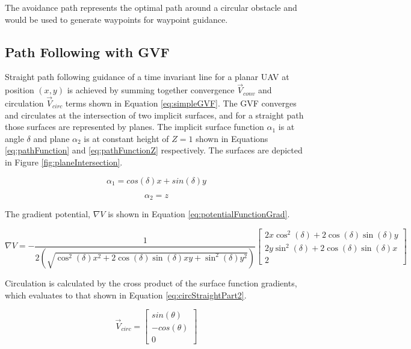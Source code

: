 \documentclass[conf]{new-aiaa}
\begin{document}
The avoidance path represents the optimal path around a circular obstacle and would be used to generate waypoints for waypoint guidance.


\subsection{Path Following with GVF}

Straight path following guidance of a time invariant line for a planar UAV at position $(x,y)$ is achieved by summing together convergence $\overrightarrow{V}_{conv}$ and circulation $\overrightarrow{V}_{circ}$ terms shown in Equation \ref{eq:simpleGVF}. The GVF converges and circulates at the intersection of two implicit surfaces, and for a straight path those surfaces are represented by planes. The implicit surface function $\alpha_1$ is at angle $\delta$ and plane $\alpha_2$ is at constant height of $Z = 1$ shown in Equations \ref{eq:pathFunction} and \ref{eq:pathFunctionZ} respectively. The surfaces are depicted in Figure \ref{fig:planeIntersection}.


\begin{equation}
\label{eq:pathFunction}
\alpha_1 = cos(\delta)x + sin(\delta)y
\end{equation}

\begin{equation}
\label{eq:pathFunctionZ}
\alpha_2 = z
\end{equation}

\noindent
The gradient potential, $\nabla V$ is shown in Equation \ref{eq:potentialFunctionGrad}.

\begin{equation}
\label{eq:potentialFunctionGrad}
\nabla V = -\frac{1}{2(\sqrt{\cos^2(\delta) x^2+2\cos(\delta)\sin(\delta) xy +\sin^2 (\delta) y^2})} \begin{bmatrix}
2x\cos^2(\delta) + 2\cos(\delta)\sin(\delta) y \\
2y\sin^2(\delta) + 2\cos(\delta)\sin(\delta) x \\
2
\end{bmatrix}
\end{equation}

\noindent
Circulation is calculated by the cross product of the surface function gradients, which evaluates to that shown in Equation \ref{eq:circStraightPart2}.



\begin{equation}
\label{eq:circStraightPart2}
\overrightarrow{V}_{circ} = \begin{bmatrix}
sin(\theta) \\
-cos(\theta) \\
0
\end{bmatrix}
\end{equation}
\end{document}
